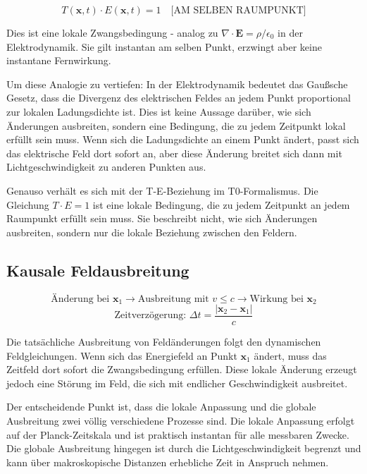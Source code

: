 \documentclass[12pt,a4paper]{article}
\begin{document}
	\begin{equation}
		T(\mathbf{x},t) \cdot E(\mathbf{x},t) = 1 \quad \text{[AM SELBEN RAUMPUNKT]} \label{eq:local_constraint}
	\end{equation}
	
	Dies ist eine lokale Zwangsbedingung - analog zu $\nabla \cdot \mathbf{E} = \rho/\epsilon_0$ in der Elektrodynamik. Sie gilt instantan am selben Punkt, erzwingt aber keine instantane Fernwirkung.
	
	Um diese Analogie zu vertiefen: In der Elektrodynamik bedeutet das Gaußsche Gesetz, dass die Divergenz des elektrischen Feldes an jedem Punkt proportional zur lokalen Ladungsdichte ist. Dies ist keine Aussage darüber, wie sich Änderungen ausbreiten, sondern eine Bedingung, die zu jedem Zeitpunkt lokal erfüllt sein muss. Wenn sich die Ladungsdichte an einem Punkt ändert, passt sich das elektrische Feld dort sofort an, aber diese Änderung breitet sich dann mit Lichtgeschwindigkeit zu anderen Punkten aus.
	
	Genauso verhält es sich mit der T-E-Beziehung im T0-Formalismus. Die Gleichung $T \cdot E = 1$ ist eine lokale Bedingung, die zu jedem Zeitpunkt an jedem Raumpunkt erfüllt sein muss. Sie beschreibt nicht, wie sich Änderungen ausbreiten, sondern nur die lokale Beziehung zwischen den Feldern.
	
	\subsection{Kausale Feldausbreitung}
	
	\begin{equation}
		\text{Änderung bei } \mathbf{x}_1 \rightarrow \text{Ausbreitung mit } v \leq c \rightarrow \text{Wirkung bei } \mathbf{x}_2
	\end{equation}
	\begin{equation}
		\text{Zeitverzögerung: } \Delta t = \frac{|\mathbf{x}_2 - \mathbf{x}_1|}{c} \label{eq:time_delay}
	\end{equation}
	
	Die tatsächliche Ausbreitung von Feldänderungen folgt den dynamischen Feldgleichungen. Wenn sich das Energiefeld an Punkt $\mathbf{x}_1$ ändert, muss das Zeitfeld dort sofort die Zwangsbedingung erfüllen. Diese lokale Änderung erzeugt jedoch eine Störung im Feld, die sich mit endlicher Geschwindigkeit ausbreitet.
	
	Der entscheidende Punkt ist, dass die lokale Anpassung und die globale Ausbreitung zwei völlig verschiedene Prozesse sind. Die lokale Anpassung erfolgt auf der Planck-Zeitskala und ist praktisch instantan für alle messbaren Zwecke. Die globale Ausbreitung hingegen ist durch die Lichtgeschwindigkeit begrenzt und kann über makroskopische Distanzen erhebliche Zeit in Anspruch nehmen.
	
\end{document}
